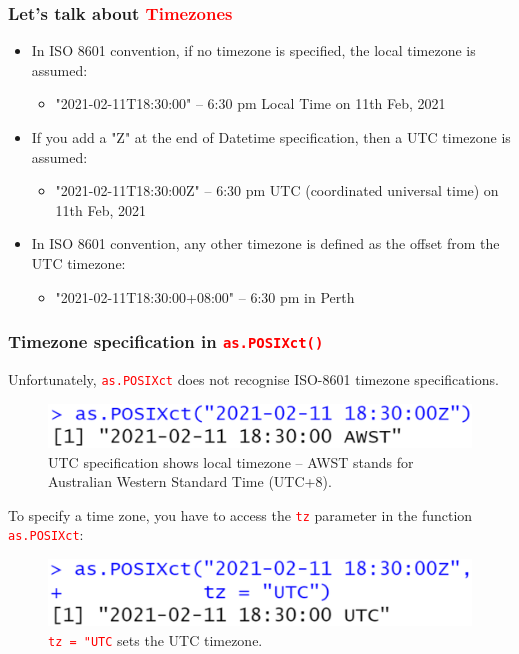 \documentclass{beamer}
\begin{document}

\begin{frame}\frametitle{Let's talk about \textbf{\textcolor{red}{Timezones}}}
\begin{itemize}
\item In ISO 8601 convention, if no timezone is specified, the local timezone is assumed: 
\begin{itemize}
\item "2021-02-11T18:30:00" -- 6:30 pm Local Time on 11th Feb, 2021
\end{itemize}
\vspace{0.3in}
\item<2-> If you add a "Z" at the end of Datetime specification, then a UTC timezone is assumed:
\begin{itemize}
\item "2021-02-11T18:30:00Z" -- 6:30 pm UTC (coordinated universal time) on 11th Feb, 2021
\end{itemize}
\vspace{0.3in}
\item<3-> In ISO 8601 convention, any other timezone is defined as the offset from the UTC timezone:
\begin{itemize}
\item "2021-02-11T18:30:00+08:00" -- 6:30 pm in Perth
\end{itemize}
\end{itemize}
\end{frame}

\begin{frame}\frametitle{Timezone specification in \texttt{\textcolor{red}{as.POSIXct()}}}
Unfortunately, \texttt{\textcolor{red}{as.POSIXct}} does not recognise ISO-8601 timezone specifications.
\begin{figure}
\includegraphics[width=0.60\linewidth]{PlotsLec4/Posixct}
\caption{{\scriptsize UTC specification shows local timezone -- AWST stands for Australian Western Standard Time (UTC+8)}.}
\end{figure}
To specify a time zone, you have to access the \textcolor{red}{\texttt{tz}} parameter in the function \textcolor{red}{\texttt{as.POSIXct}}:
\begin{figure}
\includegraphics[width=0.60\linewidth]{PlotsLec4/PosixctWithTz}
\caption{{\scriptsize \textcolor{red}{\texttt{tz = "UTC}}} sets the UTC timezone.}
\end{figure}
\end{frame}
\end{document}
